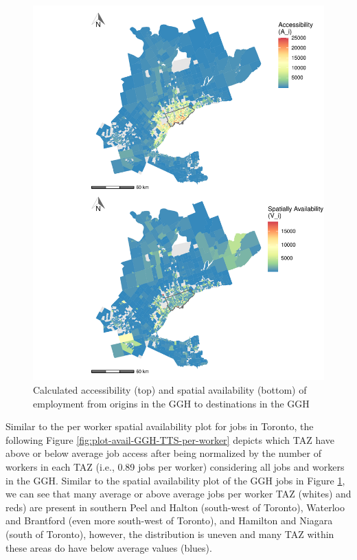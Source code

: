 \documentclass[]{elsarticle} %
\begin{document}
\begin{figure}
\includegraphics[width=1\linewidth]{Spatial-Availability_files/figure-latex/plot-access-SA-GGH-TTS-1} \caption{\label{fig:plot-access-SA-GGH-TTS}Calculated accessibility (top) and spatial availability (bottom) of employment from origins in the GGH to destinations in the GGH}\label{fig:plot-access-SA-GGH-TTS}
\end{figure}

\newpage

Similar to the per worker spatial availability plot for jobs in Toronto,
the following Figure \ref{fig:plot-avail-GGH-TTS-per-worker} depicts
which TAZ have above or below average job access after being normalized
by the number of workers in each TAZ (i.e., 0.89 jobs per worker)
considering all jobs and workers in the GGH. Similar to the spatial
availability plot of the GGH jobs in Figure
\ref{fig:plot-access-SA-GGH-TTS}, we can see that many average or above
average jobs per worker TAZ (whites) and reds) are present in southern
Peel and Halton (south-west of Toronto), Waterloo and Brantford (even
more south-west of Toronto), and Hamilton and Niagara (south of
Toronto), however, the distribution is uneven and many TAZ within these
areas do have below average values (blues).
\end{document}
